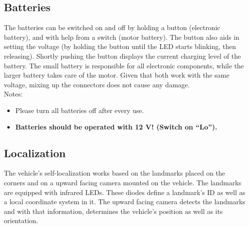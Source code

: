 \documentclass[a4paper, 11pt]{article}
\begin{document}
{\subsection{Batteries}
The batteries can be switched on and off by holding a button (electronic battery), and with help from a switch (motor battery). The button also aids in setting the voltage (by holding the button until the LED starts blinking, then releasing). Shortly pushing the button displays the current charging level of the battery. The small battery is responsible for all electronic components, while the larger battery takes care of the motor. Given that both work with the same voltage, mixing up the connectors does not cause any damage.\\ 
\newline
Notes:
\begin{itemize}
\item{Please turn all batteries off after every use.}
\item{\textbf{Batteries should be operated with 12 V! (Switch on "`Lo"').}}
\end{itemize}

\subsection{Localization}
The vehicle’s self-localization works based on the landmarks placed on the corners and on a upward facing camera mounted on the vehicle. The landmarks are equipped with infrared LEDs. These diodes define a landmark’s ID as well as a local coordinate system in it. The upward facing camera detects the landmarks and with that information, determines the vehicle’s position as well as its orientation.

}
\end{document}
